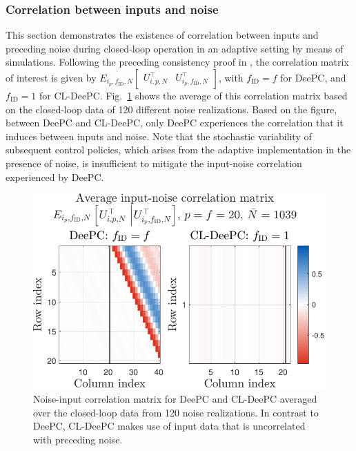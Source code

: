 \subsubsection{Correlation between inputs and noise}
\noindent This section demonstrates the existence of correlation between inputs and preceding noise during closed-loop operation in an adaptive setting by means of simulations. Following the preceding consistency proof in , the correlation matrix of interest is given by $E_{i_p,f_\mathrm{ID},N}\begin{bmatrix}U_{i,p,N}^\top & U_{i_p,f_\mathrm{ID},N}^\top\end{bmatrix}$, with $f_\mathrm{ID}=f$ for \ac{DeePC}, and $f_\mathrm{ID}=1$ for \ac{CL-DeePC}. Fig.~\ref{fig:EfUpf_correlation} shows the average of this correlation matrix based on the closed-loop data of 120 different noise realizations. Based on the figure, between \ac{DeePC} and \ac{CL-DeePC}, only \ac{DeePC} experiences the correlation that it induces between inputs and noise. Note that the stochastic variability of subsequent control policies, which arises from the adaptive implementation in the presence of noise, is insufficient to mitigate the input-noise correlation experienced by \ac{DeePC}.
\begin{figure}[b!]
\begin{center}
\includegraphics[width=\columnwidth]{results/figures/Correlation_Nbar_1039_p_20_f_20_Re_1_Ru_1_Rdu_0_Q_100_R_0_dR_10.pdf}    %
\caption{Noise-input correlation matrix for \ac{DeePC} and \ac{CL-DeePC} averaged over the closed-loop data from 120 noise realizations. In contrast to \ac{DeePC}, \ac{CL-DeePC} makes use of input data that is uncorrelated with preceding noise.}  %
\label{fig:EfUpf_correlation}                                 %
\end{center}                                 %
\end{figure}

